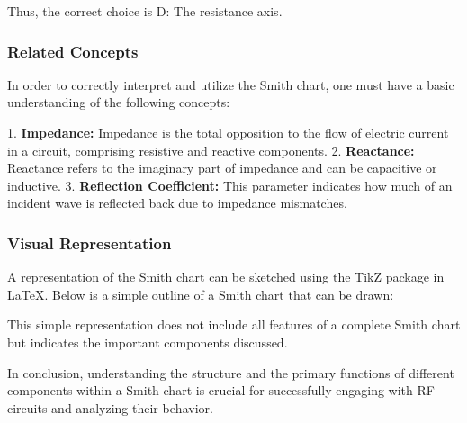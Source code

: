 Thus, the correct choice is D: The resistance axis.

\subsubsection{Related Concepts}

In order to correctly interpret and utilize the Smith chart, one must have a basic understanding of the following concepts:

1. \textbf{Impedance:} Impedance is the total opposition to the flow of electric current in a circuit, comprising resistive and reactive components.
2. \textbf{Reactance:} Reactance refers to the imaginary part of impedance and can be capacitive or inductive.
3. \textbf{Reflection Coefficient:} This parameter indicates how much of an incident wave is reflected back due to impedance mismatches.

\subsubsection{Visual Representation}

A representation of the Smith chart can be sketched using the TikZ package in LaTeX. Below is a simple outline of a Smith chart that can be drawn:


This simple representation does not include all features of a complete Smith chart but indicates the important components discussed. 

In conclusion, understanding the structure and the primary functions of different components within a Smith chart is crucial for successfully engaging with RF circuits and analyzing their behavior.
